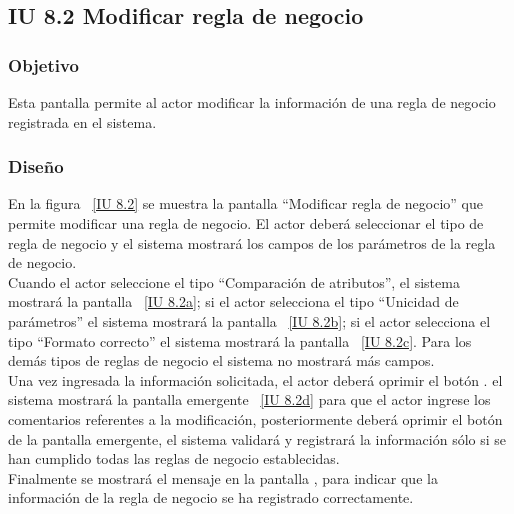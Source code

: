 \newpage 
\subsection{IU 8.2 Modificar regla de negocio}

\subsubsection{Objetivo}
	
	Esta pantalla permite al actor modificar la información de una regla de negocio registrada en el sistema.

\subsubsection{Diseño}

    En la figura ~\ref{IU 8.2} se muestra la pantalla ``Modificar regla de negocio'' que permite modificar una regla de negocio. El actor deberá 
    seleccionar el tipo de regla de negocio y el sistema mostrará los campos de los parámetros de la regla de negocio. \\
    
    Cuando el actor seleccione el tipo ``Comparación de atributos'', el sistema mostrará la pantalla ~\ref{IU 8.2a}; si el actor selecciona el tipo
    ``Unicidad de parámetros'' el sistema mostrará la pantalla ~\ref{IU 8.2b}; si el actor selecciona el tipo ``Formato correcto'' el sistema
    mostrará la pantalla ~\ref{IU 8.2c}. Para los demás tipos de reglas de negocio el sistema no mostrará más campos.\\
    
    Una vez ingresada la información solicitada, el actor deberá oprimir el botón . el sistema mostrará la pantalla emergente ~\ref{IU 8.2d} para que 
    el actor ingrese los comentarios referentes a la modificación, posteriormente deberá oprimir el botón  de la pantalla emergente, 
    el sistema validará y registrará la información sólo si se han cumplido todas las reglas de negocio establecidas.  \\
    
    Finalmente se mostrará el mensaje  en la pantalla , 
    para indicar que la información de la regla de negocio
    se ha registrado correctamente.        


